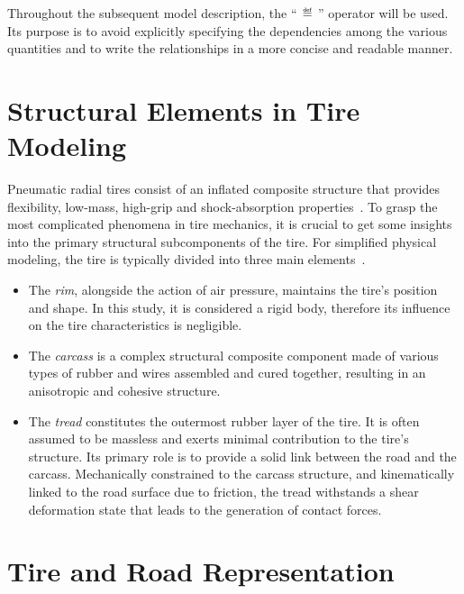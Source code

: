 Throughout the subsequent model description, the ``$\,\eqdef\,$'' operator will be used. Its purpose is to avoid explicitly specifying the dependencies among the various quantities and to write the relationships in a more concise and readable manner.


\section{Structural Elements in Tire Modeling}
\label{chap4:sec:structural_elements}

Pneumatic radial tires consist of an inflated composite structure that provides flexibility, low-mass, high-grip and shock-absorption properties~\cite{nakajima2019advanced}. To grasp the most complicated phenomena in tire mechanics, it is crucial to get some insights into the primary structural subcomponents of the tire. For simplified physical modeling, the tire is typically divided into three main elements~\cite{sarkisov2019physical}.
%
\begin{itemize}
  \setlength{\itemsep}{0pt}
  \item The \emph{rim}, alongside the action of air pressure, maintains the tire's position and shape. In this study, it is considered a rigid body, therefore its influence on the tire characteristics is negligible.
  \item The \emph{carcass} is a complex structural composite component made of various types of rubber and wires assembled and cured together, resulting in an anisotropic and cohesive structure.
  \item The \emph{tread} constitutes the outermost rubber layer of the tire. It is often assumed to be massless and exerts minimal contribution to the tire's structure. Its primary role is to provide a solid link between the road and the carcass. Mechanically constrained to the carcass structure, and kinematically linked to the road surface due to friction, the tread withstands a shear deformation state that leads to the generation of contact forces.
\end{itemize}


\section{Tire and Road Representation}
\label{chap4:sec:tire_road_representation}

